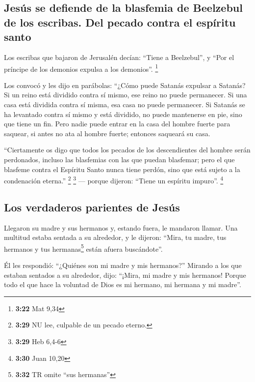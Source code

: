\begin{paracol}{2}
\hypertarget{jesuxfas-se-defiende-de-la-blasfemia-de-beelzebul-de-los-escribas.-del-pecado-contra-el-espuxedritu-santo}{%
\subsection{Jesús se defiende de la blasfemia de Beelzebul de los
escribas. Del pecado contra el espíritu
santo}\label{jesuxfas-se-defiende-de-la-blasfemia-de-beelzebul-de-los-escribas.-del-pecado-contra-el-espuxedritu-santo}}

 Los escribas que bajaron de Jerusalén decían: ``Tiene a
Beelzebul'', y ``Por el príncipe de los demonios expulsa a los
demonios''. \footnote{\textbf{3:22} Mat 9,34}

 Los convocó y les dijo en parábolas: ``¿Cómo puede
Satanás expulsar a Satanás?  Si un reino está dividido
contra sí mismo, ese reino no puede permanecer.  Si una
casa está dividida contra sí misma, esa casa no puede permanecer.
 Si Satanás se ha levantado contra sí mismo y está
dividido, no puede mantenerse en pie, sino que tiene un fin.
 Pero nadie puede entrar en la casa del hombre fuerte
para saquear, si antes no ata al hombre fuerte; entonces saqueará su
casa.

 ``Ciertamente os digo que todos los pecados de los
descendientes del hombre serán perdonados, incluso las blasfemias con
las que puedan blasfemar;  pero el que blasfeme contra el
Espíritu Santo nunca tiene perdón, sino que está sujeto a la condenación
eterna.'' \footnote{\textbf{3:29} NU lee, culpable de un pecado eterno.}
\footnote{\textbf{3:29} Heb 6,4-6}  --- porque dijeron:
``Tiene un espíritu impuro''. \footnote{\textbf{3:30} Juan 10,20}

\hypertarget{los-verdaderos-parientes-de-jesuxfas}{%
\subsection{Los verdaderos parientes de
Jesús}\label{los-verdaderos-parientes-de-jesuxfas}}

 Llegaron su madre y sus hermanos y, estando fuera, le
mandaron llamar.  Una multitud estaba sentada a su
alrededor, y le dijeron: ``Mira, tu madre, tus hermanos y tus
hermanas\footnote{\textbf{3:32} TR omite ``sus hermanas''} están afuera
buscándote''.

 Él les respondió: ``¿Quiénes son mi madre y mis
hermanos?''  Mirando a los que estaban sentados a su
alrededor, dijo: ``¡Mira, mi madre y mis hermanos! 
Porque todo el que hace la voluntad de Dios es mi hermano, mi hermana y
mi madre''.


\end{paracol}
